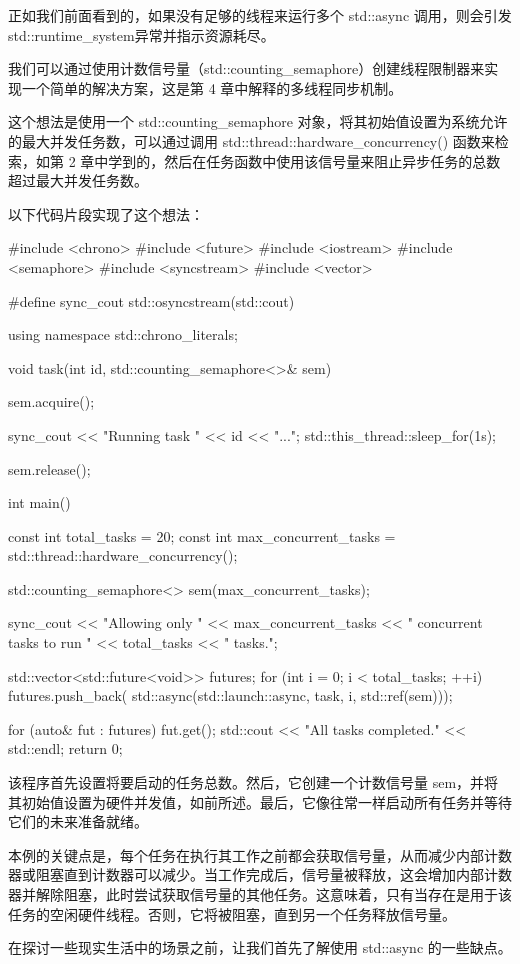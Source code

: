 正如我们前面看到的，如果没有足够的线程来运行多个 std::async 调用，则会引发 std::runtime\_system异常并指示资源耗尽。

我们可以通过使用计数信号量（std::counting\_semaphore）创建线程限制器来实现一个简单的解决方案，这是第 4 章中解释的多线程同步机制。

这个想法是使用一个 std::counting\_semaphore 对象，将其初始值设置为系统允许的最大并发任务数，可以通过调用 std::thread::hardware\_concurrency() 函数来检索，如第 2 章中学到的，然后在任务函数中使用该信号量来阻止异步任务的总数超过最大并发任务数。

以下代码片段实现了这个想法：

\begin{cpp}
#include <chrono>
#include <future>
#include <iostream>
#include <semaphore>
#include <syncstream>
#include <vector>

#define sync_cout std::osyncstream(std::cout)

using namespace std::chrono_literals;

void task(int id, std::counting_semaphore<>& sem) {
    sem.acquire();

    sync_cout << "Running task " << id << "...\n";
    std::this_thread::sleep_for(1s);

    sem.release();
}

int main() {
    const int total_tasks = 20;
    const int max_concurrent_tasks =
              std::thread::hardware_concurrency();

    std::counting_semaphore<> sem(max_concurrent_tasks);

    sync_cout << "Allowing only "
              << max_concurrent_tasks
              << " concurrent tasks to run "
              << total_tasks << " tasks.\n";

    std::vector<std::future<void>> futures;
    for (int i = 0; i < total_tasks; ++i) {
        futures.push_back(
            std::async(std::launch::async,
                task, i, std::ref(sem)));
    }

    for (auto& fut : futures) {
        fut.get();
    }
    std::cout << "All tasks completed." << std::endl;
    return 0;
}
\end{cpp}

该程序首先设置将要启动的任务总数。然后，它创建一个计数信号量 sem，并将其初始值设置为硬件并发值，如前所述。最后，它像往常一样启动所有任务并等待它们的未来准备就绪。

本例的关键点是，每个任务在执行其工作之前都会获取信号量，从而减少内部计数器或阻塞直到计数器可以减少。当工作完成后，信号量被释放，这会增加内部计数器并解除阻塞，此时尝试获取信号量的其他任务。这意味着，只有当存在是用于该任务的空闲硬件线程。否则，它将被阻塞，直到另一个任务释放信号量。

在探讨一些现实生活中的场景之前，让我们首先了解使用 std::async 的一些缺点。






